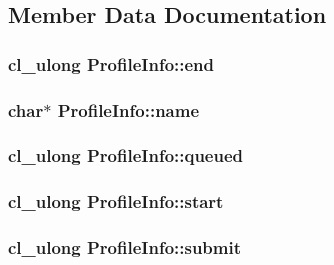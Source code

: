 \subsection{Member Data Documentation}
\hypertarget{class_profile_info_a39aab2b4d4063380631a9152e9010097}{
\subsubsection[{end}]{\setlength{\rightskip}{0pt plus 5cm}cl\-\_\-ulong Profile\-Info\-::end}}\label{class_profile_info_a39aab2b4d4063380631a9152e9010097}
\hypertarget{class_profile_info_a8342c9173f28acfd70dce1efbf1af84d}{
\subsubsection[{name}]{\setlength{\rightskip}{0pt plus 5cm}char$\ast$ Profile\-Info\-::name}}\label{class_profile_info_a8342c9173f28acfd70dce1efbf1af84d}
\hypertarget{class_profile_info_a1ec52326b6d9017a6bfbf35a6479f02c}{
\subsubsection[{queued}]{\setlength{\rightskip}{0pt plus 5cm}cl\-\_\-ulong Profile\-Info\-::queued}}\label{class_profile_info_a1ec52326b6d9017a6bfbf35a6479f02c}
\hypertarget{class_profile_info_aac70270ea427ef769432e3ec92e6c868}{
\subsubsection[{start}]{\setlength{\rightskip}{0pt plus 5cm}cl\-\_\-ulong Profile\-Info\-::start}}\label{class_profile_info_aac70270ea427ef769432e3ec92e6c868}
\hypertarget{class_profile_info_a6b72ab24fed530fff6d55e51d4849d43}{
\subsubsection[{submit}]{\setlength{\rightskip}{0pt plus 5cm}cl\-\_\-ulong Profile\-Info\-::submit}}\label{class_profile_info_a6b72ab24fed530fff6d55e51d4849d43}
